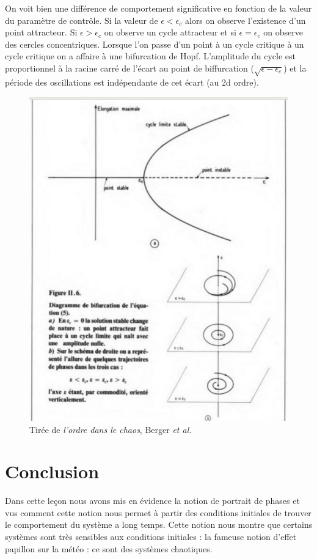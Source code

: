 \documentclass{article}
\begin{document}
On voit bien une différence de comportement significative en fonction de la valeur du paramètre de contrôle. Si la valeur de $\epsilon <\epsilon_c$ alors on observe l'existence d'un point attracteur. Si $\epsilon>\epsilon_c$ on observe un cycle attracteur et si $\epsilon=\epsilon_c$ on observe des cercles concentriques. Lorsque l'on passe d'un point à un cycle critique à un cycle critique on a affaire à une bifurcation de Hopf. L'amplitude du cycle est proportionnel à la racine carré de l'écart au point de biffurcation ($\sqrt{\epsilon-\epsilon_c}$) et la période des oscillations est indépendante de cet écart (au 2d ordre).  
\begin{figure}
    \centering
    \includegraphics[width=.9\linewidth]{bifurc_Hopf.png}
    \caption{Tirée de \textit{l'ordre dans le chaos}, Berger \textit{et al.} }
    \label{fig:my_label}
\end{figure}

\section{Conclusion}

Dans cette leçon nous avons mis en évidence la notion de portrait de phases et vus comment cette notion nous permet à partir des conditions initiales de trouver le comportement du système a long temps. Cette notion nous montre que certains systèmes sont très sensibles aux conditions initiales :  la fameuse notion d'effet papillon sur la météo : ce sont des systèmes chaotiques. 
\end{document}
